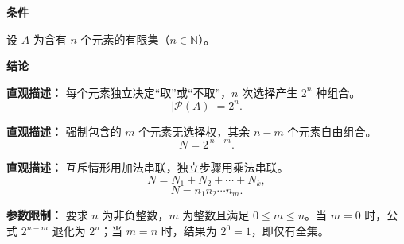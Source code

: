 \begin{statementbox}

	\textbf{\textcolor{CStatement}{条件}}
	\begin{description}[style=nextline, leftmargin=2.8em, labelsep=0.5em, itemsep=0.35em]
		\item[\textbf{\textcolor{CStatement}{条件 1（有限集合）：}}] 设 $A$ 为含有 $n$ 个元素的有限集（$n\in\mathbb{N}$）。
	\end{description}

	\textbf{\textcolor{CStatement}{结论}}
	\begin{description}[style=nextline, leftmargin=2.8em, labelsep=0.5em, itemsep=0.45em]
		\item[\textbf{\textcolor{CStatement}{结论一（所有子集）：}}]
			\textbf{\textcolor{CStatement}{直观描述：}}
			每个元素独立决定“取”或“不取”，$n$ 次选择产生 $2^n$ 种组合。
			\[
				|\mathcal{P}(A)| = 2^n.
			\]

		\item[\textbf{\textcolor{CStatement}{结论二（含指定元素）：}}]
			\textbf{\textcolor{CStatement}{直观描述：}}
			强制包含的 $m$ 个元素无选择权，其余 $n-m$ 个元素自由组合。
			\[
				N = 2^{\,n-m}.
			\]

		\item[\textbf{\textcolor{CStatement}{推广结论（加法乘法原理）：}}]
			\textbf{\textcolor{CStatement}{直观描述：}}
			互斥情形用加法串联，独立步骤用乘法串联。
			\[
				N = N_1 + N_2 + \cdots + N_k,
			\]
			\[
				N = n_1 n_2 \cdots n_m.
			\]
	\end{description}

	\textbf{\textcolor{CStatement}{参数限制：}}
	要求 $n$ 为非负整数，$m$ 为整数且满足 $0 \le m \le n$。当 $m=0$ 时，公式 $2^{n-m}$ 退化为 $2^n$；当 $m=n$ 时，结果为 $2^0=1$，即仅有全集。

\end{statementbox}
